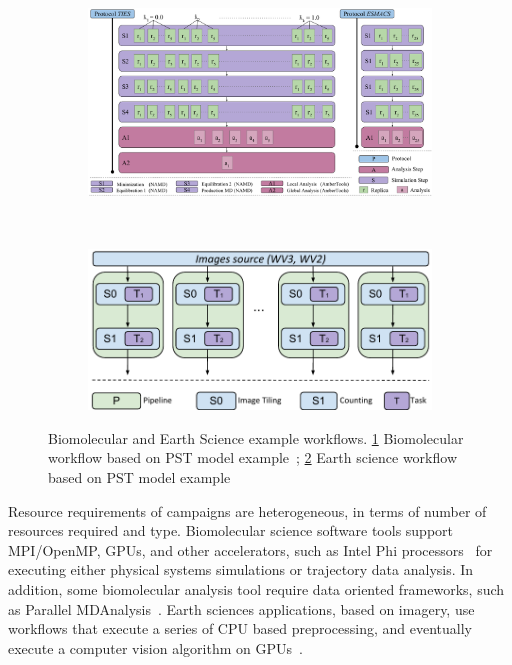 \begin{figure}[ht!]
    \centering
    \begin{subfigure}[b]{0.45\textwidth}
        \includegraphics[width=\linewidth]{figures/bio_workflow.pdf}
        \caption{}
        \label{fig:bio_workflow}
    \end{subfigure}%
    ~ 
    \begin{subfigure}[b]{0.45\textwidth}
        \includegraphics[width=\linewidth]{figures/earth_workflow.pdf}
        \caption{}
        \label{fig:earth_workflow}
    \end{subfigure}
    \caption{Biomolecular and Earth Science example workflows. \ref{fig:bio_workflow} Biomolecular workflow based on PST model example~\cite{dakka2018concurrent}; \ref{fig:earth_workflow} Earth science workflow based on PST model example~\cite{paraskevakos2019workflow}}\label{fig:bio_earth_workflows}
\end{figure}

Resource requirements of  campaigns are heterogeneous, in terms of number of resources required and type. 
Biomolecular science software tools support MPI/OpenMP, GPUs, and other accelerators, such as Intel Phi processors~\cite{cheatham2015impact} for executing either physical systems simulations or trajectory data analysis. 
In addition, some biomolecular analysis tool require data oriented frameworks, such as Parallel MDAnalysis~\cite{fan2019pmda}.
Earth sciences applications, based on imagery, use workflows that execute a series of CPU based preprocessing, and eventually execute a computer vision algorithm on GPUs~\cite{paraskevakos2019workflow}.

